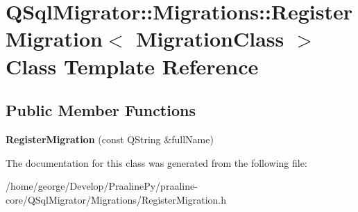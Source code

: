 \hypertarget{class_q_sql_migrator_1_1_migrations_1_1_register_migration}{}\section{Q\+Sql\+Migrator\+:\+:Migrations\+:\+:Register\+Migration$<$ Migration\+Class $>$ Class Template Reference}
\label{class_q_sql_migrator_1_1_migrations_1_1_register_migration}
\subsection*{Public Member Functions}
\begin{DoxyCompactItemize}
\item 
\mbox{\label{class_q_sql_migrator_1_1_migrations_1_1_register_migration_a3724f225c9cf7c12a281274373d302ca}} 
{\bfseries Register\+Migration} (const Q\+String \&full\+Name)
\end{DoxyCompactItemize}


The documentation for this class was generated from the following file\+:\begin{DoxyCompactItemize}
\item 
/home/george/\+Develop/\+Praaline\+Py/praaline-\/core/\+Q\+Sql\+Migrator/\+Migrations/Register\+Migration.\+h\end{DoxyCompactItemize}
